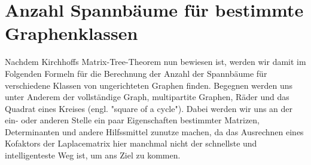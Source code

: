 \section{Anzahl Spannbäume für bestimmte Graphenklassen}
Nachdem Kirchhoffs Matrix-Tree-Theorem nun bewiesen ist, werden wir damit im Folgenden Formeln für die Berechnung der Anzahl der Spannbäume für verschiedene Klassen von ungerichteten Graphen finden. Begegnen werden uns unter Anderem der vollständige Graph, multipartite Graphen, Räder und das Quadrat eines Kreises (engl. "square of a cycle"). Dabei werden wir uns an der ein- oder anderen Stelle ein paar Eigenschaften bestimmter Matrizen, Determinanten und andere Hilfssmittel zunutze machen, da das Ausrechnen eines Kofaktors der Laplacematrix hier manchmal nicht der schnellste und intelligenteste Weg ist, um ans Ziel zu kommen. 








